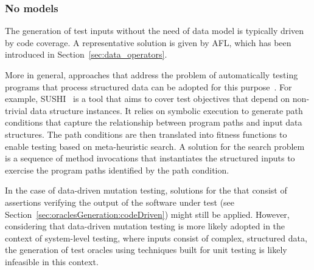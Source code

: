 \subsubsection{No models}


The generation of test inputs without the need of data model is typically driven by code coverage. A representative solution is given by AFL, which has been introduced in Section~\ref{sec:data_operators}. 

More in general, approaches that address the problem of automatically testing programs that process structured data can be adopted for this purpose~\cite{Kiran:2008,Braione:2017,Braione:2018}. For example, SUSHI~\cite{Braione:2018} is a tool that aims to cover test objectives that depend on non-trivial data structure instances. 
It relies on symbolic execution to generate path conditions that capture the relationship between program paths and input data structures. The path conditions are then translated into fitness functions to enable testing based on meta-heuristic search. A solution for the search problem is a sequence of method invocations that instantiates the structured inputs to exercise the program paths identified by the path condition. 

\label{sec:oracles:dataMutation}

In the case of data-driven mutation testing, solutions for the  that consist of assertions verifying the output of the software under test (see Section~\ref{sec:oraclesGeneration:codeDriven}) might still be applied. However, considering that data-driven mutation testing is more likely adopted in the context of system-level testing, where inputs consist of complex, structured data, the generation of test oracles using techniques built for unit testing is likely infeasible in this context. 

